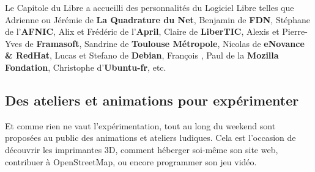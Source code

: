 Le Capitole du Libre a accueilli des personnalités du Logiciel Libre telles que Adrienne  ou Jérémie  de \textbf{La Quadrature du Net}, Benjamin  de \textbf{FDN}, Stéphane  de l'\textbf{AFNIC}, Alix  et Frédéric  de l'\textbf{April}, Claire  de \textbf{LiberTIC}, Alexis  et Pierre-Yves  de \textbf{Framasoft}, Sandrine  de \textbf{Toulouse Métropole}, Nicolas  de \textbf{eNovance \& RedHat}, Lucas  et Stefano  de \textbf{Debian}, François , Paul  de la \textbf{Mozilla Fondation}, Christophe  d'\textbf{Ubuntu-fr}, etc.

\subsection{Des ateliers et animations pour expérimenter}


\begin{minipage}{0.6\textwidth}
Et comme rien ne vaut l'expérimentation, tout au long du weekend sont 
proposées au public des animations et ateliers ludiques. Cela est 
l'occasion de découvrir les imprimantes 3D, comment héberger soi-même son 
site web, contribuer à OpenStreetMap, ou encore programmer son jeu vidéo.
\end{minipage}
\begin{minipage}{0.4\textwidth}
\end{minipage}

